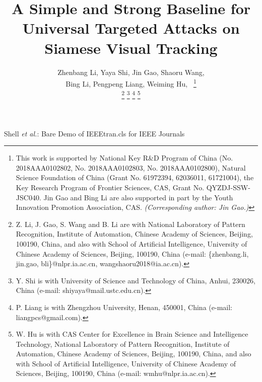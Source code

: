 \documentclass[journal]{IEEEtran}
\begin{document}
\title{A Simple and Strong Baseline for Universal Targeted Attacks on Siamese Visual Tracking}
\author{
  Zhenbang Li, Yaya Shi, Jin Gao, Shaoru Wang,\\ Bing Li, Pengpeng Liang, Weiming Hu,~
  \thanks{This work is supported by National Key R\&D Program of China (No. 2018AAA0102802, No. 2018AAA0102803, No. 2018AAA0102800), Natural Science Foundation of China (Grant No. 61972394, 62036011, 61721004), the Key Research Program of Frontier Sciences, CAS, Grant No. QYZDJ-SSW-JSC040. Jin Gao and Bing Li are also supported in part by the Youth Innovation Promotion Association, CAS. \textit{(Corresponding author: Jin Gao.)}}
  
  \thanks{Z. Li, J. Gao, S. Wang and B. Li are with National Laboratory of Pattern Recognition, Institute of Automation, Chinese Academy of Sciences, Beijing, 100190, China, and also with School of Artificial Intelligence, University of Chinese Academy of Sciences, Beijing, 100190, China (e-mail: \{zhenbang.li, jin.gao, bli\}@nlpr.ia.ac.cn, wangshaoru2018@ia.ac.cn).}
  \thanks{Y. Shi is with University of Science and Technology of China, Anhui, 230026, China (e-mail: shiyaya@mail.ustc.edu.cn).}
  \thanks{P. Liang is with Zhengzhou University, Henan, 450001, China (e-mail: liangpcs@gmail.com).}
  \thanks{W. Hu is with CAS Center for Excellence in Brain Science and Intelligence Technology, National Laboratory of Pattern Recognition, Institute of Automation, Chinese Academy of Sciences, Beijing, 100190, China, and also with School of Artificial Intelligence, University of Chinese Academy of Sciences, Beijing, 100190, China (e-mail: wmhu@nlpr.ia.ac.cn).}
}

{Shell \MakeLowercase{\textit{et al.}}: Bare Demo of IEEEtran.cls for IEEE Journals}
\maketitle
\end{document}
